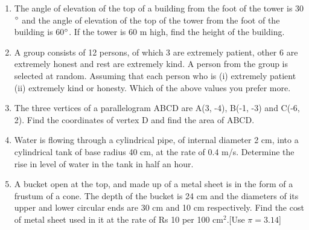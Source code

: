 \documentclass[journal,12pt,twocolumn]{IEEEtran}
\renewcommand\thesection{\arabic{section}}
\begin{document}
\begin{enumerate}[label=\thesection.\arabic*.,ref=\thesection.\theenumi]
\item The angle of elevation of the top of a building from the foot of the tower is 30$\degree$ and the angle of elevation of the top of the tower from the foot of the building is 60$\degree$. If the tower is 60 m high, find the height of the building. 
\item A group consists of 12 persons, of which 3 are extremely patient, other 6 are extremely honest and rest are extremely kind. A person from the group is selected at random. Assuming that each person who is (i) extremely patient (ii) extremely kind or honesty. Which of the above values you prefer more.
\item The three vertices of a parallelogram ABCD are A(3, -4), B(-1, -3) and C(-6, 2). Find the coordinates of vertex D and find the area of ABCD.
\item Water is flowing through a cylindrical pipe, of internal diameter 2 cm, into a cylindrical tank of base radius 40 cm, at the rate of 0.4 m/s. Determine the rise in level of water in the tank in half an hour.
\item A bucket open at the top, and made up of a metal sheet is in the form of a frustum of a cone. The depth of the bucket is 24 cm and the diameters of its upper and lower circular ends are 30 cm and 10 cm respectively. Find the cost of metal sheet used in it at the rate of Rs 10 per 100 cm$^2$.[Use $\pi=3.14$]
\end{enumerate}
\end{document}

